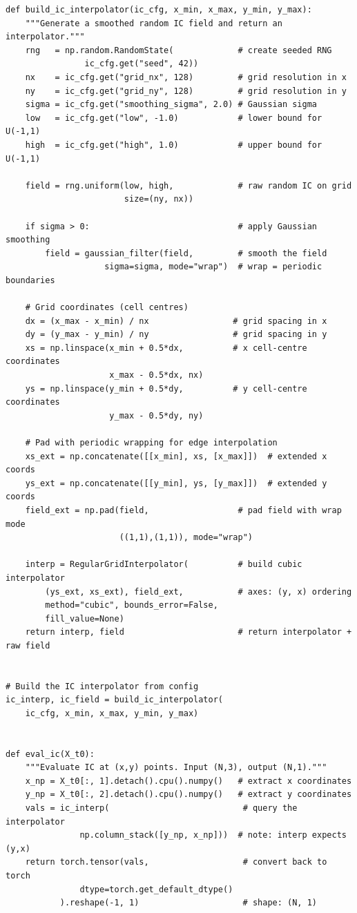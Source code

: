 \documentclass[11pt,a4paper]{article}
\begin{document}
\begin{lstlisting}
def build_ic_interpolator(ic_cfg, x_min, x_max, y_min, y_max):
    """Generate a smoothed random IC field and return an interpolator."""
    rng   = np.random.RandomState(             # create seeded RNG
                ic_cfg.get("seed", 42))
    nx    = ic_cfg.get("grid_nx", 128)         # grid resolution in x
    ny    = ic_cfg.get("grid_ny", 128)         # grid resolution in y
    sigma = ic_cfg.get("smoothing_sigma", 2.0) # Gaussian sigma
    low   = ic_cfg.get("low", -1.0)            # lower bound for U(-1,1)
    high  = ic_cfg.get("high", 1.0)            # upper bound for U(-1,1)

    field = rng.uniform(low, high,             # raw random IC on grid
                        size=(ny, nx))

    if sigma > 0:                              # apply Gaussian smoothing
        field = gaussian_filter(field,         # smooth the field
                    sigma=sigma, mode="wrap")  # wrap = periodic boundaries

    # Grid coordinates (cell centres)
    dx = (x_max - x_min) / nx                 # grid spacing in x
    dy = (y_max - y_min) / ny                 # grid spacing in y
    xs = np.linspace(x_min + 0.5*dx,          # x cell-centre coordinates
                     x_max - 0.5*dx, nx)
    ys = np.linspace(y_min + 0.5*dy,          # y cell-centre coordinates
                     y_max - 0.5*dy, ny)

    # Pad with periodic wrapping for edge interpolation
    xs_ext = np.concatenate([[x_min], xs, [x_max]])  # extended x coords
    ys_ext = np.concatenate([[y_min], ys, [y_max]])  # extended y coords
    field_ext = np.pad(field,                  # pad field with wrap mode
                       ((1,1),(1,1)), mode="wrap")

    interp = RegularGridInterpolator(          # build cubic interpolator
        (ys_ext, xs_ext), field_ext,           # axes: (y, x) ordering
        method="cubic", bounds_error=False,
        fill_value=None)
    return interp, field                       # return interpolator + raw field


# Build the IC interpolator from config
ic_interp, ic_field = build_ic_interpolator(
    ic_cfg, x_min, x_max, y_min, y_max)


def eval_ic(X_t0):
    """Evaluate IC at (x,y) points. Input (N,3), output (N,1)."""
    x_np = X_t0[:, 1].detach().cpu().numpy()   # extract x coordinates
    y_np = X_t0[:, 2].detach().cpu().numpy()   # extract y coordinates
    vals = ic_interp(                           # query the interpolator
               np.column_stack([y_np, x_np]))  # note: interp expects (y,x)
    return torch.tensor(vals,                   # convert back to torch
               dtype=torch.get_default_dtype()
           ).reshape(-1, 1)                     # shape: (N, 1)



\end{lstlisting}
\end{document}
